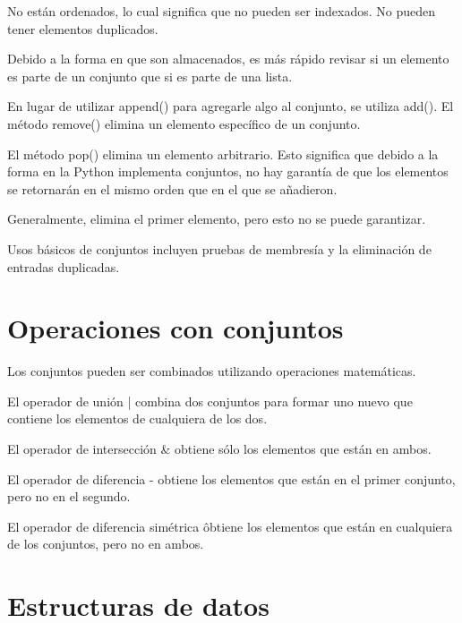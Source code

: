 \documentclass{report}
\begin{document}
No están ordenados, lo cual significa que no pueden ser indexados. No pueden tener elementos duplicados.\smallskip

Debido a la forma en que son almacenados, es más rápido revisar si un elemento es parte de un conjunto que si es parte de una lista.\smallskip

En lugar de utilizar append() para agregarle algo al conjunto, se utiliza add(). El método remove() elimina un elemento específico de un conjunto.


El método pop() elimina un elemento arbitrario. Esto significa que debido a la forma en la Python implementa conjuntos, no hay garantía de que los elementos se retornarán en el mismo orden que en el que se añadieron.\smallskip

Generalmente, elimina el primer elemento, pero esto no se puede garantizar.


Usos básicos de conjuntos incluyen pruebas de membresía y la eliminación de entradas duplicadas.

\section{Operaciones con conjuntos}

Los conjuntos pueden ser combinados utilizando operaciones matemáticas.\smallskip

El operador de unión | combina dos conjuntos para formar uno nuevo que contiene los elementos de cualquiera de los dos.


El operador de intersección \& obtiene sólo los elementos que están en ambos.


El operador de diferencia - obtiene los elementos que están en el primer conjunto, pero no en el segundo.


El operador de diferencia simétrica \^ obtiene los elementos que están en cualquiera de los conjuntos, pero no en ambos.


\section{Estructuras de datos}
\end{document}
